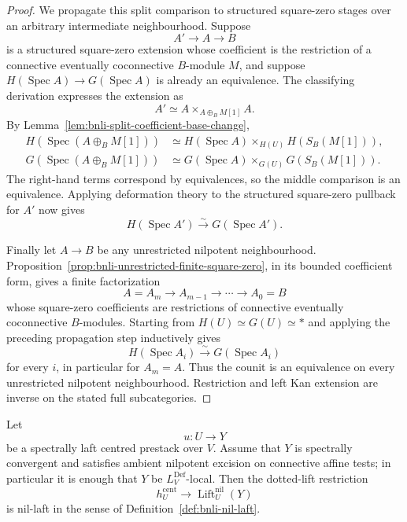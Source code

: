 \begin{proof}
We propagate this split comparison to structured square-zero stages over an
arbitrary intermediate neighbourhood.  Suppose
\[
    A'\longrightarrow A\longrightarrow B
\]
is a structured square-zero extension whose coefficient is the restriction
of a connective eventually coconnective $B$-module $M$, and suppose
$H(\operatorname{Spec}A)\to G(\operatorname{Spec}A)$ is already an
equivalence.  The classifying derivation expresses the extension as
\[
    A'
    \simeq
    A\times_{A\oplus_BM[1]}A.
\]
By Lemma~\ref{lem:bnli-split-coefficient-base-change},
\[
\begin{aligned}
H(\operatorname{Spec}(A\oplus_BM[1]))
&\simeq
H(\operatorname{Spec}A)
\times_{H(U)}
H(S_B(M[1])),\\
G(\operatorname{Spec}(A\oplus_BM[1]))
&\simeq
G(\operatorname{Spec}A)
\times_{G(U)}
G(S_B(M[1])).
\end{aligned}
\]
The right-hand terms correspond by equivalences, so the middle comparison
is an equivalence.  Applying deformation theory to the structured
square-zero pullback for $A'$ now gives
\[
    H(\operatorname{Spec}A')
    \xrightarrow{\sim}
    G(\operatorname{Spec}A').
\]

Finally let $A\to B$ be any unrestricted nilpotent neighbourhood.
Proposition~\ref{prop:bnli-unrestricted-finite-square-zero}, in its bounded
coefficient form, gives a finite factorization
\[
    A=A_m\longrightarrow A_{m-1}\longrightarrow\cdots
    \longrightarrow A_0=B
\]
whose square-zero coefficients are restrictions of connective eventually
coconnective $B$-modules.  Starting from
$H(U)\simeq G(U)\simeq *$ and applying the preceding propagation step
inductively gives
\[
    H(\operatorname{Spec}A_i)
    \xrightarrow{\sim}
    G(\operatorname{Spec}A_i)
\]
for every $i$, in particular for $A_m=A$.  Thus the counit is an
equivalence on every unrestricted nilpotent neighbourhood.  Restriction and
left Kan extension are inverse on the stated full subcategories.
\end{proof}

\begin{proposition}
\label{prop:bnli-spectral-laft-implies-nil-laft}
Let
\[
    u:U\longrightarrow Y
\]
be a spectrally laft centred prestack over $V$.  Assume that $Y$ is
spectrally convergent and satisfies ambient nilpotent excision on connective
affine tests; in particular it is enough that $Y$ be
$L_V^{\mathrm{Def}}$-local.  Then the dotted-lift restriction
\[
    h_U^{\mathrm{cent}}
    \longrightarrow
    \operatorname{Lift}^{\mathrm{nil}}_U(Y)
\]
is nil-laft in the sense of Definition~\ref{def:bnli-nil-laft}.
\end{proposition}

